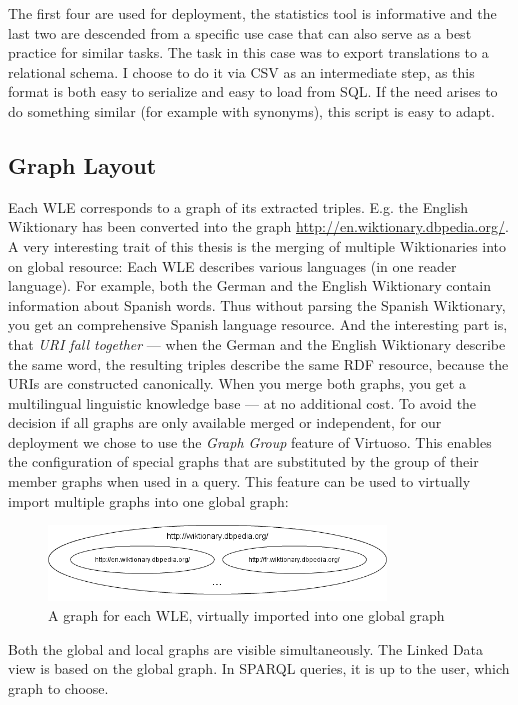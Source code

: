 The first four are used for deployment, the statistics tool is informative and the last two are descended from a specific use case that can also serve as a best practice for similar tasks. The task in this case was to export translations to a relational schema. I choose to do it via CSV as an intermediate step, as this format is both easy to serialize and easy to load from SQL. If the need arises to do something similar (for example with synonyms), this script is easy to adapt.

\subsection{Graph Layout}
Each WLE corresponds to a graph of its extracted triples. E.g. the English Wiktionary has been converted into the graph \url{http://en.wiktionary.dbpedia.org/}. A very interesting trait of this thesis is the merging of multiple Wiktionaries into on global resource: Each WLE describes various languages (in one reader language). For example, both the German and the English Wiktionary contain information about Spanish words. Thus without parsing the Spanish Wiktionary, you get an comprehensive Spanish language resource. And the interesting part is, that \textit{URI fall together} --- when the German and the English Wiktionary describe the same word, the resulting triples describe the same RDF resource, because the URIs are constructed canonically. When you merge both graphs, you get a multilingual linguistic knowledge base --- at no additional cost. To avoid the decision if all graphs are only available merged or independent, for our deployment we chose to use the \textit{Graph Group} feature of Virtuoso. This enables the configuration of special graphs that are substituted by the group of their member graphs when used in a query. This feature can be used to virtually import multiple graphs into one global graph:
\begin{figure}[h!]
\centering
\includegraphics[width=0.8\textwidth]{../images/graphs}
\caption{A graph for each WLE, virtually imported into one global graph}
\label{fig:graphs}
\end{figure}

Both the global and local graphs are visible simultaneously. The Linked Data view is based on the global graph. In SPARQL queries, it is up to the user, which graph to choose. 

\newpage

